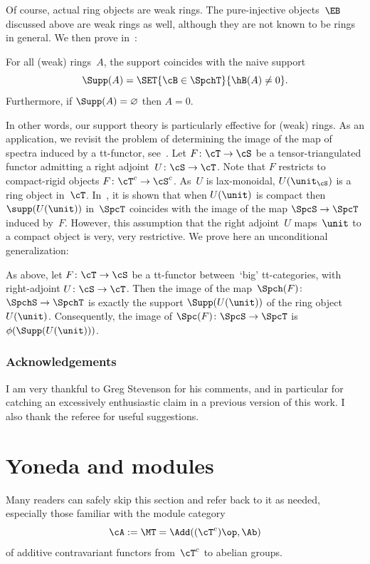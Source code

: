 Of course, actual ring objects are weak rings. The pure-injective objects~$\EB$ discussed above are weak rings as well, although they are not known to be rings in general. We then prove in~:
\begin{Thm}
\label{Thm:rings-intro}
For all (weak) rings~$A$, the support coincides with the naive support
\[
\Supp(A)=\SET{\cB\in\SpchT}{\hB(A)\neq 0}.
\]
Furthermore, if $\Supp(A)=\varnothing$ then $A=0$.
\end{Thm}

In other words, our support theory is particularly effective for (weak) rings. As an application, we revisit the problem of determining the image of the map of spectra induced by a tt-functor, see~\cite{Balmer18a}. Let $F\colon \cT\to \cS$ be a tensor-triangulated functor admitting a right adjoint~$U\colon \cS\to \cT$. Note that $F$ restricts to compact-rigid objects $F\colon\cT^c\to \cS^c$. As~$U$ is lax-monoidal, $U(\unit_\cS)$ is a ring object in~$\cT$. In~\cite{Balmer18a}, it is shown that when $U(\unit)$ is compact then $\supp(U(\unit))$ in~$\SpcT$ coincides with the image of the map $\SpcS\to \SpcT$ induced by~$F$. However, this assumption that the right adjoint~$U$ maps~$\unit$ to a compact object is very, very restrictive. We prove here an unconditional generalization:
\begin{Thm}
\label{Thm:Spc-image-intro}
As above, let $F\colon \cT\to \cS$ be a tt-functor between~`big' tt\nobreakdash-categories, with right-adjoint $U\colon \cS\to \cT$. Then the image of the map~$\Spch(F)\colon$ $\SpchS\to \SpchT$ is exactly the support $\Supp(U(\unit))$ of the ring object~$U(\unit)$. Consequently, the image of $\Spc(F)\colon \SpcS\to \SpcT$ is $\phi(\Supp(U(\unit)))$.
\end{Thm}

\subsubsection*{Acknowledgements}
I am very thankful to Greg Stevenson for his comments, and in particular for catching an excessively enthusiastic claim in a previous version of this work. I also thank the referee for useful suggestions.

\section{Yoneda and modules}
\label{sec:modules}

Many readers can safely skip this section and refer back to it as needed, especially those familiar with the module category
\[
\cA:=\MT=\Add((\cT^c)\op,\Ab)
\]
of additive contravariant functors from~$\cT^c$ to abelian groups.

